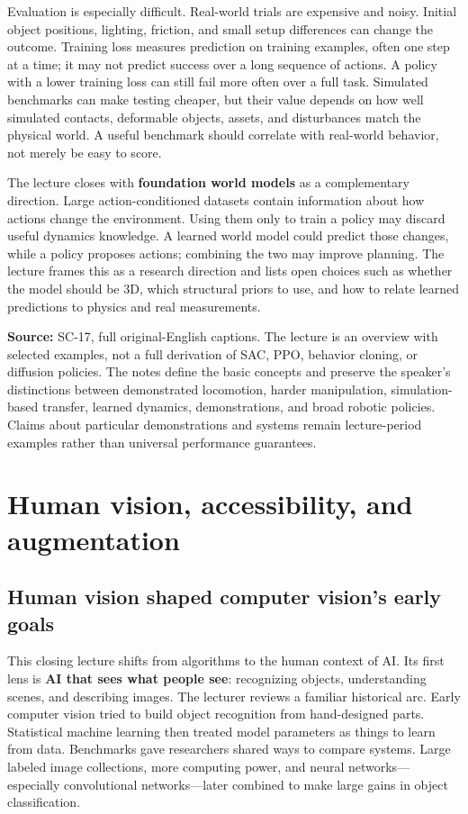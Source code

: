Evaluation is especially difficult. Real-world trials are expensive and noisy. Initial object positions, lighting, friction, and small setup differences can change the outcome. Training loss measures prediction on training examples, often one step at a time; it may not predict success over a long sequence of actions. A policy with a lower training loss can still fail more often over a full task. Simulated benchmarks can make testing cheaper, but their value depends on how well simulated contacts, deformable objects, assets, and disturbances match the physical world. A useful benchmark should correlate with real-world behavior, not merely be easy to score.

The lecture closes with \textbf{foundation world models} as a complementary direction. Large action-conditioned datasets contain information about how actions change the environment. Using them only to train a policy may discard useful dynamics knowledge. A learned world model could predict those changes, while a policy proposes actions; combining the two may improve planning. The lecture frames this as a research direction and lists open choices such as whether the model should be 3D, which structural priors to use, and how to relate learned predictions to physics and real measurements.

\textbf{Source:} SC-17, full original-English captions. The lecture is an overview with selected examples, not a full derivation of SAC, PPO, behavior cloning, or diffusion policies. The notes define the basic concepts and preserve the speaker's distinctions between demonstrated locomotion, harder manipulation, simulation-based transfer, learned dynamics, demonstrations, and broad robotic policies. Claims about particular demonstrations and systems remain lecture-period examples rather than universal performance guarantees.

\section{Human vision, accessibility, and augmentation}\label{04-visual-computing-ii-ch034-human-vision-accessibility-and-augmentation}

\subsection{Human vision shaped computer vision's early goals}\label{04-visual-computing-ii-ch034-human-vision-shaped-computer-visions-early-goals}

This closing lecture shifts from algorithms to the human context of AI. Its first lens is \textbf{AI that sees what people see}: recognizing objects, understanding scenes, and describing images. The lecturer reviews a familiar historical arc. Early computer vision tried to build object recognition from hand-designed parts. Statistical machine learning then treated model parameters as things to learn from data. Benchmarks gave researchers shared ways to compare systems. Large labeled image collections, more computing power, and neural networks---especially convolutional networks---later combined to make large gains in object classification.


